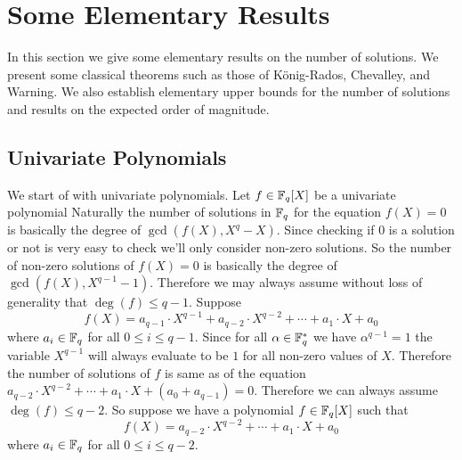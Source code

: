 \section{Some Elementary Results}\label{sec:elementary-results}
In this section we give some elementary results on the number of solutions. We present some classical theorems such as those of K\"{o}nig-Rados, Chevalley, and Warning. We also establish elementary upper bounds for the number of solutions and results on the expected order of magnitude.
\subsection{Univariate Polynomials}
We start of with univariate polynomials. Let $f\in\mathbb{F}_q[X]$ be a univariate polynomial Naturally the number of solutions in $\mathbb{F}_q$ for the equation $f(X)=0$ is basically the degree of $\gcd(f(X),X^q-X)$. Since checking if $0$ is a solution or not is very easy to check we'll only consider non-zero solutions. So the number of non-zero solutions of $f(X)=0$ is basically the degree of $\gcd(f(X),X^{q-1}-1)$. Therefore we may always assume without loss of generality that $\deg(f)\leq q-1$. Suppose $$f(X)=a_{q-1}\cdot X^{q-1}+a_{q-2}\cdot X^{q-2}+\cdots+a_1\cdot X+a_0$$where $a_i\in\mathbb{F}_q$ for all $0\leq i\leq q-1$. Since for all $\alpha\in\mathbb{F}_q^*$ we have $\alpha^{q-1}=1$ the variable $X^{q-1}$ will always evaluate to be $1$ for all non-zero values of $X$. Therefore the number of solutions of $f$ is same as of the equation $a_{q-2}\cdot X^{q-2}+\cdots+a_1\cdot X+(a_0+a_{q-1})=0$. Therefore we can always assume $\deg(f)\leq q-2$. So suppose we have a polynomial $f\in\mathbb{F}_q[X]$ such that $$f(X)=a_{q-2}\cdot X^{q-2}+\cdots+a_1\cdot X+a_0$$where $a_i\in\mathbb{F}_q$ for all $0\leq i\leq q-2$.

